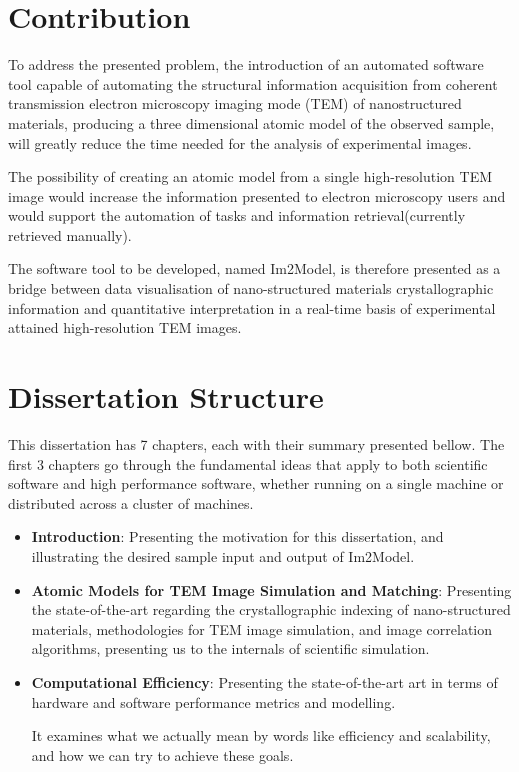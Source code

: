 \documentclass[
  oneside,
  11pt, a4paper,
  footinclude=true,
  headinclude=true,
  cleardoublepage=empty
]{scrbook}
\begin{document}
	\section{Contribution}
	
	To address the presented problem, the introduction of an automated software tool capable of automating the structural information acquisition from coherent transmission electron microscopy imaging mode (TEM) of nanostructured materials, producing a three dimensional atomic model of the observed sample, will greatly reduce the time needed for the analysis of experimental images.\par 
	
	The possibility of creating an atomic model from a single high-resolution TEM image would increase the information presented to electron microscopy users and would support the automation of tasks and information retrieval(currently retrieved manually).\par 
	
	The software tool to be developed, named Im2Model, is therefore presented as a bridge between data visualisation of nano-structured materials crystallographic information and quantitative interpretation in a real-time basis of experimental attained high-resolution TEM images.\par 
	
	
	
		\section{Dissertation Structure}
		
This dissertation has 7 chapters, each with their summary presented bellow.
The first 3 chapters go through the fundamental ideas that apply to both scientific software and high performance software, whether running on a single machine or distributed across a cluster of machines.


\begin{itemize}
    \item \textbf{Introduction}: Presenting the motivation for this dissertation, and illustrating the desired sample input and output of Im2Model.
    

    
     \item \textbf{Atomic Models for TEM Image Simulation and Matching}:
    Presenting the state-of-the-art regarding the  crystallographic indexing of nano-structured materials,  methodologies for TEM image simulation, and image correlation algorithms, presenting us to the internals of scientific simulation.
        
    \item \textbf{Computational Efficiency}:  Presenting the state-of-the-art art in terms of hardware and
software performance metrics and modelling.

    It examines what we actually mean by words like efficiency and scalability, and how we can try to achieve these goals.
    
    \end{itemize}
    
\end{document}
